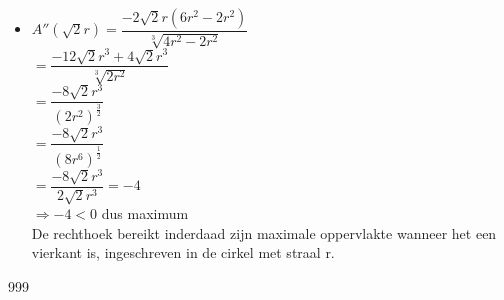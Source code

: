 \documentclass[a4paper]{article}
\begin{document}
\begin{itemize}
	$ = \dfrac{-3b}{\sqrt{4r^2 - b^2}} - \dfrac{b^3}{\sqrt[3]{4r^2 - b^2}}$\\
	
	$ = \dfrac{-3b(4r^2 - b^2) - b^3}{\sqrt[3]{4r^2 - b^2}}$\\
	
	$ = \dfrac{-12br^2 + 2b^3}{\sqrt[3]{4r^2-b^2}} = \dfrac{-2b(6r^2 - b^2)}{\sqrt[3]{4r^2-b^2}}$\\
	
	\item $A''(\sqrt{2}r) = \dfrac{-2\sqrt{2}r(6r^2 - 2r^2)}{\sqrt[3]{4r^2 - 2r^2}}$\\
	
	$ = \dfrac{-12\sqrt{2}r^3 + 4\sqrt{2}r^3}{\sqrt[3]{2r^2}}$\\
	
	$ = \dfrac{-8\sqrt{2}r^3}{(2r^2)^{\tfrac{3}{2}}}$\\
	
	$ = \dfrac{-8\sqrt{2}r^3}{(8r^6)^{\tfrac{1}{2}}}$\\
	
	$ = \dfrac{-8\sqrt{2}r^3}{2\sqrt{2}r^3} = -4$\\
	
	$ \Rightarrow -4 < 0$ dus maximum\\
	
	 De rechthoek bereikt inderdaad zijn maximale oppervlakte wanneer het een vierkant is, ingeschreven in de cirkel met straal r.
	
	
\end{itemize}

\begin{thebibliography}{999}
\end{thebibliography}
\end{document}
